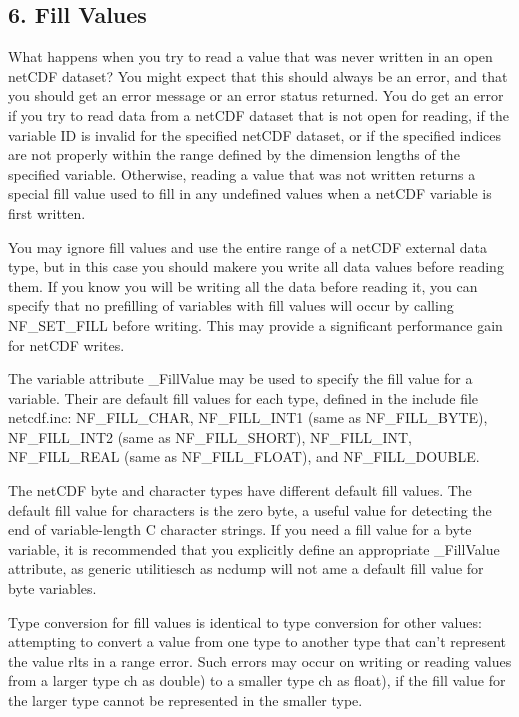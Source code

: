 \subsection*{6. Fill Values }

What happens when you try to read a value that was never written in an open net\+C\+DF dataset? You might expect that this should always be an error, and that you should get an error message or an error status returned. You do get an error if you try to read data from a net\+C\+DF dataset that is not open for reading, if the variable ID is invalid for the specified net\+C\+DF dataset, or if the specified indices are not properly within the range defined by the dimension lengths of the specified variable. Otherwise, reading a value that was not written returns a special fill value used to fill in any undefined values when a net\+C\+DF variable is first written.

You may ignore fill values and use the entire range of a net\+C\+DF external data type, but in this case you should makere you write all data values before reading them. If you know you will be writing all the data before reading it, you can specify that no prefilling of variables with fill values will occur by calling N\+F\+\_\+\+S\+E\+T\+\_\+\+F\+I\+LL before writing. This may provide a significant performance gain for net\+C\+DF writes.

The variable attribute \+\_\+\+Fill\+Value may be used to specify the fill value for a variable. Their are default fill values for each type, defined in the include file netcdf.\+inc\+: N\+F\+\_\+\+F\+I\+L\+L\+\_\+\+C\+H\+AR, N\+F\+\_\+\+F\+I\+L\+L\+\_\+\+I\+N\+T1 (same as N\+F\+\_\+\+F\+I\+L\+L\+\_\+\+B\+Y\+TE), N\+F\+\_\+\+F\+I\+L\+L\+\_\+\+I\+N\+T2 (same as N\+F\+\_\+\+F\+I\+L\+L\+\_\+\+S\+H\+O\+RT), N\+F\+\_\+\+F\+I\+L\+L\+\_\+\+I\+NT, N\+F\+\_\+\+F\+I\+L\+L\+\_\+\+R\+E\+AL (same as N\+F\+\_\+\+F\+I\+L\+L\+\_\+\+F\+L\+O\+AT), and N\+F\+\_\+\+F\+I\+L\+L\+\_\+\+D\+O\+U\+B\+LE.

The net\+C\+DF byte and character types have different default fill values. The default fill value for characters is the zero byte, a useful value for detecting the end of variable-\/length C character strings. If you need a fill value for a byte variable, it is recommended that you explicitly define an appropriate \+\_\+\+Fill\+Value attribute, as generic utilitiesch as ncdump will not ame a default fill value for byte variables.

Type conversion for fill values is identical to type conversion for other values\+: attempting to convert a value from one type to another type that can’t represent the value rlts in a range error. Such errors may occur on writing or reading values from a larger type ch as double) to a smaller type ch as float), if the fill value for the larger type cannot be represented in the smaller type.

